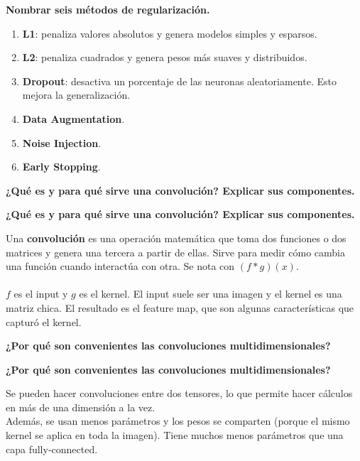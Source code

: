 \documentclass[10pt]{memoir}
\begin{document}
\clearpage
\begin{center}
	\textbf{\Large Nombrar seis métodos de regularización.}
\end{center}
\begin{enumerate}
	\item \textbf{L1}: penaliza valores absolutos y genera modelos simples y esparsos.
	\item \textbf{L2}: penaliza cuadrados y genera pesos más suaves y distribuidos.
	\item \textbf{Dropout}: desactiva un porcentaje de las neuronas aleatoriamente. Esto mejora la generalización.
	\item \textbf{Data Augmentation}.
	\item \textbf{Noise Injection}.
	\item \textbf{Early Stopping}.
\end{enumerate}

\clearpage
\begin{center}
	\textbf{\Large ¿Qué es y para qué sirve una convolución? Explicar sus componentes.}
\end{center}

\clearpage
\begin{center}
	\textbf{\Large ¿Qué es y para qué sirve una convolución? Explicar sus componentes.}
\end{center}
\noindent Una \textbf{convolución} es una operación matemática que toma dos funciones o dos matrices y genera una tercera a partir de ellas. Sirve para medir cómo cambia una función cuando interactúa con otra. Se nota con \((f * g)(x)\). \\
\\
\noindent $f$ es el input y $g$ es el kernel. El input suele ser una imagen y el kernel es una matriz chica. El resultado es el feature map, que son algunas características que capturó el kernel.

\clearpage
\begin{center}
	\textbf{\Large ¿Por qué son convenientes las convoluciones multidimensionales?}
\end{center}

\clearpage
\begin{center}
	\textbf{\Large ¿Por qué son convenientes las convoluciones multidimensionales?}
\end{center}
\noindent Se pueden hacer convoluciones entre dos tensores, lo que permite hacer cálculos en más de una dimensión a la vez. \\
Además, se usan menos parámetros y los pesos se comparten (porque el mismo kernel se aplica en toda la imagen). Tiene muchos menos parámetros que una capa fully-connected.
\end{document}
